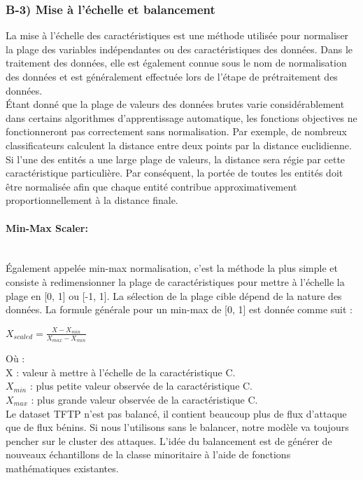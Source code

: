\subsubsection{B-3) Mise à l'échelle et balancement}
La mise à l'échelle des caractéristiques est une méthode utilisée pour normaliser la plage des variables indépendantes ou des caractéristiques des données. Dans le traitement des données, elle est également connue sous le nom de normalisation des données et est généralement effectuée lors de l'étape de prétraitement des données.\\

\noindent Étant donné que la plage de valeurs des données brutes varie considérablement dans certains algorithmes d'apprentissage automatique, les fonctions objectives ne fonctionneront pas correctement sans normalisation. Par exemple, de nombreux classificateurs calculent la distance entre deux points par la distance euclidienne. Si l'une des entités a une large plage de valeurs, la distance sera régie par cette caractéristique particulière. Par conséquent, la portée de toutes les entités doit être normalisée afin que chaque entité contribue approximativement proportionnellement à la distance finale.

\paragraph{Min-Max Scaler: \\\\}
Également appelée min-max normalisation, c'est la méthode la plus simple et consiste à redimensionner la plage de caractéristiques pour mettre à l'échelle la plage en [0, 1] ou [-1, 1]. La sélection de la plage cible dépend de la nature des données. La formule générale pour un min-max de [0, 1] est donnée comme suit :
\begin{center}
{\large $ X_{scaled} = \frac{X - X_{min}}{X_{max} - X_{min}} $}
\end{center}
Où :\\

\indent X : valeur à mettre à l'échelle de la caractéristique C.\\
\indent $X_{min}$ : plus petite valeur observée de la caractéristique C.\\
\indent $X_{max}$ : plus grande valeur observée de la caractéristique C.\\

Le dataset TFTP n'est pas balancé, il contient beaucoup plus de flux d'attaque que de flux bénins. Si nous l'utilisons sans le balancer, notre modèle va toujours pencher sur le cluster des attaques. L'idée du balancement est de générer de nouveaux échantillons de la classe minoritaire à l'aide de fonctions mathématiques existantes.

